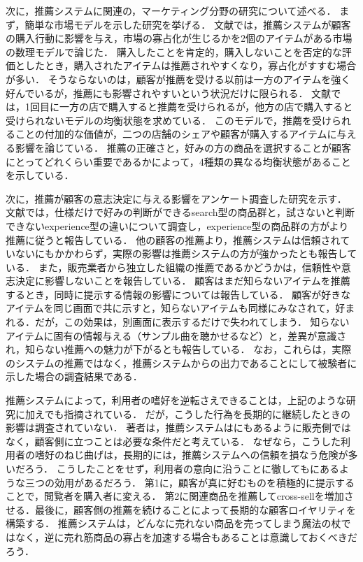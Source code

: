 次に，推薦システムに関連の，マーケティング分野の研究について述べる．
まず，簡単な市場モデルを示した研究を挙げる．
文献\cite{ec:030}では，推薦システムが顧客の購入行動に影響を与え，市場の寡占化が生じるかを2個のアイテムがある市場の数理モデルで論じた．
購入したことを肯定的，購入しないことを否定的な評価としたとき，購入されたアイテムは推薦されやすくなり，寡占化がすすむ場合が多い．
そうならないのは，顧客が推薦を受ける以前は一方のアイテムを強く好んでいるが，推薦にも影響されやすいという状況だけに限られる．
文献\cite{ec:031}では，1回目に一方の店で購入すると推薦を受けられるが，他方の店で購入すると受けられないモデルの均衡状態を求めている．
このモデルで，推薦を受けられることの付加的な価値が，二つの店舗のシェアや顧客が購入するアイテムに与える影響を論じている．
推薦の正確さと，好みの方の商品を選択することが顧客にとってどれくらい重要であるかによって，4種類の異なる均衡状態があることを示している．

次に，推薦が顧客の意志決定に与える影響をアンケート調査した研究を示す．
文献\cite{ej:053}では，仕様だけで好みの判断ができるsearch型の商品群と，試さないと判断できないexperience型の違いについて調査し，experience型の商品群の方がより推薦に従うと報告している．
他の顧客の推薦より，推薦システムは信頼されていないにもかかわらず，実際の影響は推薦システムの方が強かったとも報告している．
また，販売業者から独立した組織の推薦であるかどうかは，信頼性や意志決定に影響しないことを報告している．
顧客はまだ知らないアイテムを推薦するとき，同時に提示する情報の影響について\cite{ej:054}は報告している．
顧客が好きなアイテムを同じ画面で共に示すと，知らないアイテムも同様にみなされて，好まれる．だが，この効果は，別画面に表示するだけで失われてしまう．
知らないアイテムに固有の情報与える（サンプル曲を聴かせるなど）と，差異が意識され，知らない推薦への魅力が下がるとも報告している．
なお，これらは，実際のシステムの推薦ではなく，推薦システムからの出力であることにして被験者に示した場合の調査結果である．

推薦システムによって，利用者の嗜好を逆転さえできることは，上記のような研究に加え\cite{sigchi:03:02}でも指摘されている．
だが，こうした行為を長期的に継続したときの影響は調査されていない．
著者は，推薦システムは\cite{dmkd:01:01}にもあるように販売側ではなく，顧客側に立つことは必要な条件だと考えている．
なぜなら，こうした利用者の嗜好のねじ曲げは，長期的には，推薦システムへの信頼を損なう危険が多いだろう．
こうしたことをせず，利用者の意向に沿うことに徹しても\cite{dmkd:01:01}にあるような三つの効用があるだろう．
第1に，顧客が真に好むものを積極的に提示することで，閲覧者を購入者に変える．
第2に関連商品を推薦してcross-sellを増加させる．最後に，顧客側の推薦を続けることによって長期的な顧客ロイヤリティを構築する．
推薦システムは，どんなに売れない商品を売ってしまう魔法の杖ではなく，逆に売れ筋商品の寡占を加速する場合もあることは意識しておくべきだろう．

